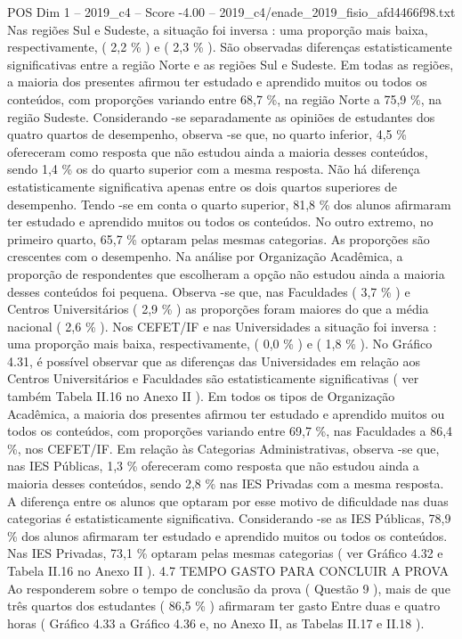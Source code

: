 \begin{textsample}{POS Dim 1 – 2019\_c4 – Score -4.00 – 2019\_c4/enade\_2019\_fisio\_afd4466f98.txt}
Nas regiões Sul e Sudeste, a situação foi inversa : uma proporção mais baixa, respectivamente, ( 2,2 \% ) e ( 2,3 \% ).
São observadas diferenças estatisticamente significativas entre a região Norte e as regiões Sul e Sudeste.
Em todas as regiões, a maioria dos presentes afirmou ter estudado e aprendido muitos ou todos os conteúdos, com proporções variando entre 68,7 \%, na região Norte a 75,9 \%, na região Sudeste.
Considerando -se separadamente as opiniões de estudantes dos quatro quartos de desempenho, observa -se que, no quarto inferior, 4,5 \% ofereceram como resposta que não estudou ainda a maioria desses conteúdos, sendo 1,4 \% os do quarto superior com a mesma resposta.
Não há diferença estatisticamente significativa apenas entre os dois quartos superiores de desempenho.
Tendo -se em conta o quarto superior, 81,8 \% dos alunos afirmaram ter estudado e aprendido muitos ou todos os conteúdos.
No outro extremo, no primeiro quarto, 65,7 \% optaram pelas mesmas categorias.
As proporções são crescentes com o desempenho.
Na análise por Organização Acadêmica, a proporção de respondentes que escolheram a opção não estudou ainda a maioria desses conteúdos foi pequena.
Observa -se que, nas Faculdades ( 3,7 \% ) e Centros Universitários ( 2,9 \% ) as proporções foram maiores do que a média nacional ( 2,6 \% ).
Nos CEFET/IF e nas Universidades a situação foi inversa : uma proporção mais baixa, respectivamente, ( 0,0 \% ) e ( 1,8 \% ).
No Gráfico 4.31, é possível observar que as diferenças das Universidades em relação aos Centros Universitários e Faculdades são estatisticamente significativas ( ver também Tabela II.16 no Anexo II ).
Em todos os tipos de Organização Acadêmica, a maioria dos presentes afirmou ter estudado e aprendido muitos ou todos os conteúdos, com proporções variando entre 69,7 \%, nas Faculdades a 86,4 \%, nos CEFET/IF.
Em relação às Categorias Administrativas, observa -se que, nas IES Públicas, 1,3 \% ofereceram como resposta que não estudou ainda a maioria desses conteúdos, sendo 2,8 \% nas IES Privadas com a mesma resposta.
A diferença entre os alunos que optaram por esse motivo de dificuldade nas duas categorias é estatisticamente significativa.
Considerando -se as IES Públicas, 78,9 \% dos alunos afirmaram ter estudado e aprendido muitos ou todos os conteúdos.
Nas IES Privadas, 73,1 \% optaram pelas mesmas categorias ( ver Gráfico 4.32 e Tabela II.16 no Anexo II ). 4.7 TEMPO GASTO PARA CONCLUIR A PROVA Ao responderem sobre o tempo de conclusão da prova ( Questão 9 ), mais de que três quartos dos estudantes ( 86,5 \% ) afirmaram ter gasto Entre duas e quatro horas ( Gráfico 4.33 a Gráfico 4.36 e, no Anexo II, as Tabelas II.17 e II.18 ).

\end{textsample}
